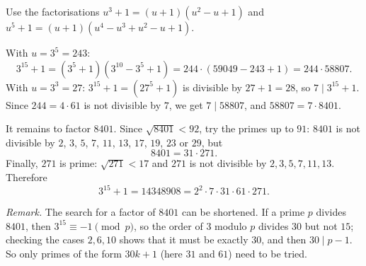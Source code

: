 Use the factorisations $u^3+1=(u+1)\left(u^2-u+1\right)$ and $u^5+1=(u+1)\left(u^4-u^3+u^2-u+1\right)$.

With $u=3^5=243$:
\[3^{15}+1=\left(3^5+1\right)\left(3^{10}-3^5+1\right)=244\cdot\left(59049-243+1\right)=244\cdot58807 .\]
With $u=3^3=27$: $3^{15}+1=\left(27^5+1\right)$ is divisible by $27+1=28$, so $7\mid3^{15}+1$. Since $244=4\cdot61$ is not divisible by $7$, we get $7\mid58807$, and $58807=7\cdot8401$.

It remains to factor $8401$. Since $\sqrt{8401}<92$, try the primes up to $91$: $8401$ is not divisible by $2$, $3$, $5$, $7$, $11$, $13$, $17$, $19$, $23$ or $29$, but
\[8401=31\cdot271 .\]
Finally, $271$ is prime: $\sqrt{271}<17$ and $271$ is not divisible by $2,3,5,7,11,13$. Therefore
\[3^{15}+1=14348908=\boxed{2^2\cdot7\cdot31\cdot61\cdot271}.\]

\emph{Remark.} The search for a factor of $8401$ can be shortened. If a prime $p$ divides $8401$, then $3^{15}\equiv-1\pmod p$, so the order of $3$ modulo $p$ divides $30$ but not $15$; checking the cases $2,6,10$ shows that it must be exactly $30$, and then $30\mid p-1$. So only primes of the form $30k+1$ (here $31$ and $61$) need to be tried.
